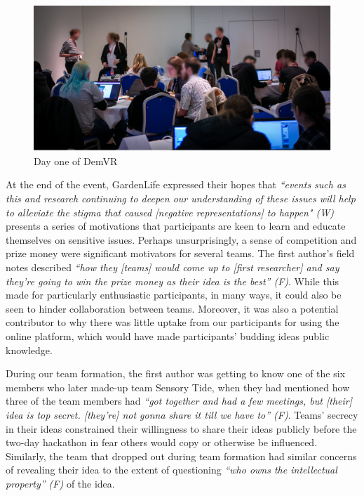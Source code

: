 \begin{figure}[htp]
\centering
\includegraphics[width=.8\linewidth]{Images/DemVR/Findings/DayOneDemVR.png}
\caption{Day one of DemVR}
\label{fig:DayOne}
\end{figure}

At the end of the event, GardenLife expressed their hopes that \textit{“events such as this and research continuing to deepen our understanding of these issues will help to alleviate the stigma that caused [negative representations] to happen" (W)} presents a series of motivations that participants are keen to learn and educate themselves on sensitive issues. Perhaps unsurprisingly, a sense of competition and prize money were significant motivators for several teams. The first author’s field notes described \textit{“how they [teams] would come up to [first researcher] and say they’re going to win the prize money as their idea is the best” (F)}. While this made for particularly enthusiastic participants, in many ways, it could also be seen to hinder collaboration between teams. Moreover, it was also a potential contributor to why there was little uptake from our participants for using the online platform, which would have made participants’ budding ideas public knowledge.

During our team formation, the first author was getting to know one of the six members who later made-up team Sensory Tide, when they had mentioned how three of the team members had \textit{“got together and had a few meetings, but [their] idea is top secret. [they’re] not gonna share it till we have to” (F)}. Teams’ secrecy in their ideas constrained their willingness to share their ideas publicly before the two-day hackathon in fear others would copy or otherwise be influenced. Similarly, the team that dropped out during team formation had similar concerns of revealing their idea to the extent of questioning \textit{“who owns the intellectual property” (F)} of the idea. 

